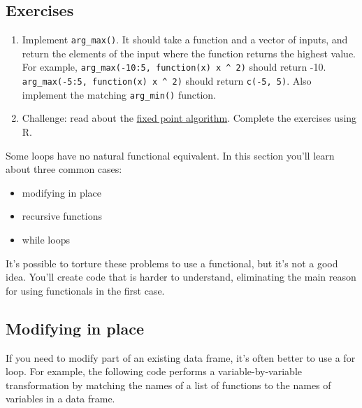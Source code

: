 \subsection{Exercises}

\begin{enumerate}
\def\labelenumi{\arabic{enumi}.}
\item
  Implement \texttt{arg\_max()}. It should take a function and a vector
  of inputs, and return the elements of the input where the function
  returns the highest value. For example,
  \texttt{arg\_max(-10:5, function(x) x \^{} 2)} should return -10.
  \texttt{arg\_max(-5:5, function(x) x \^{} 2)} should return
  \texttt{c(-5, 5)}. Also implement the matching \texttt{arg\_min()}
  function.
\item
  Challenge: read about the
  \href{http://mitpress.mit.edu/sicp/full-text/book/book-Z-H-12.html\#\%_sec_1.3}{fixed
  point algorithm}. Complete the exercises using R.
\end{enumerate}


Some loops have no natural functional equivalent. In this section you'll
learn about three common cases: 

\begin{itemize}
\itemsep1pt\parskip0pt
\item
  modifying in place
\item
  recursive functions
\item
  while loops
\end{itemize}

It's possible to torture these problems to use a functional, but it's
not a good idea. You'll create code that is harder to understand,
eliminating the main reason for using functionals in the first case.

\subsection{Modifying in place}

If you need to modify part of an existing data frame, it's often better
to use a for loop. For example, the following code performs a
variable-by-variable transformation by matching the names of a list of
functions to the names of variables in a data frame.

